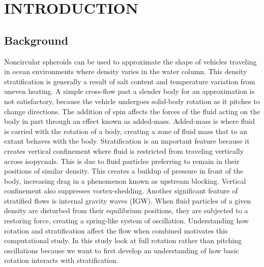 %
%
%
%

\chapter{INTRODUCTION}
\thispagestyle{empty}

\section{Background}
Noncircular spheroids can be used to approximate the shape of vehicles traveling in ocean environments where density varies in the water column. This density stratification is generally a result of salt content and temperature variation from uneven heating. A simple cross-flow past a slender body for an approximation is not satisfactory, because the vehicle undergoes solid-body rotation as it pitches to change directions. The addition of spin affects the forces of the fluid acting on the body in part through an effect known as added-mass. Added-mass is where fluid is carried with the rotation of a body, creating a zone of fluid mass that to an extant behaves with the body.  Stratification is an important feature because it creates vertical confinement where fluid is restricted from traveling vertically across isopycnals. This is due to fluid particles preferring to remain in their positions of similar density. This creates a buildup of pressure in front of the body, increasing  drag in a phenomenon known as upstream blocking. Vertical confinement also suppresses vortex-shedding. Another significant feature of stratified flows is internal gravity waves (IGW). When fluid particles of a given density are disturbed from their equilibrium positions, they are subjected to a restoring force, creating a spring-like system of oscillation. Understanding how rotation and stratification affect the flow when combined motivates this computational study. In this study look at full rotation rather than pitching oscillations because we want to first develop an understanding of how basic rotation interacts with stratification.

